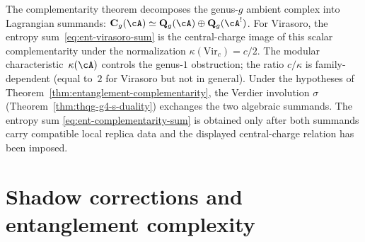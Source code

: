\begin{remark}
\label{rem:ent-as-projection}
The complementarity theorem decomposes the genus-$g$ ambient
complex into Lagrangian summands:
$\mathbf C_g(\cA) \simeq \mathbf Q_g(\cA)\oplus
\mathbf Q_g(\cA^!)$.
For Virasoro, the entropy sum~\eqref{eq:ent-virasoro-sum}
is the central-charge image of this scalar complementarity
under the normalization $\kappa(\mathrm{Vir}_c)=c/2$.
The modular characteristic~$\kappa(\cA)$ controls the genus-$1$
obstruction; the ratio
$c/\kappa$ is family-dependent (equal to~$2$ for Virasoro but not in general).
Under the hypotheses of Theorem~\ref{thm:entanglement-complementarity},
the Verdier involution $\sigma$
(Theorem~\ref{thm:thqg-g4-s-duality})
exchanges the two algebraic summands.  The entropy sum
\eqref{eq:ent-complementarity-sum} is obtained only after both
summands carry compatible local replica data and the displayed
central-charge relation has been imposed.
\end{remark}

%
%

\section{Shadow corrections and entanglement complexity}
\label{sec:ent-shadow-corrections}

